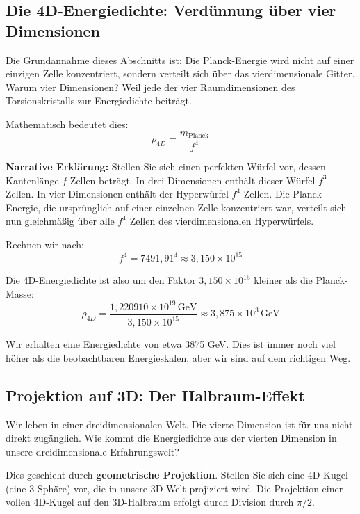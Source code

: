 	\subsection{Die 4D-Energiedichte: Verdünnung über vier Dimensionen}
	
	Die Grundannahme dieses Abschnitts ist: Die Planck-Energie wird nicht auf einer einzigen Zelle konzentriert, sondern verteilt sich über das vierdimensionale Gitter. Warum vier Dimensionen? Weil jede der vier Raumdimensionen des Torsionskristalls zur Energiedichte beiträgt.
	
	Mathematisch bedeutet dies:
	\begin{equation}
		\boxed{\rho_{4D} = \frac{m_{\text{Planck}}}{f^4}}
	\end{equation}
	
	\textbf{Narrative Erklärung:} Stellen Sie sich einen perfekten Würfel vor, dessen Kantenlänge \(f\) Zellen beträgt. In drei Dimensionen enthält dieser Würfel \(f^3\) Zellen. In vier Dimensionen enthält der Hyperwürfel \(f^4\) Zellen. Die Planck-Energie, die ursprünglich auf einer einzelnen Zelle konzentriert war, verteilt sich nun gleichmäßig über alle \(f^4\) Zellen des vierdimensionalen Hyperwürfels.
	
	Rechnen wir nach:
	\begin{equation}
		f^4 = 7491{,}91^4 \approx 3{,}150 \times 10^{15}
	\end{equation}
	
	Die 4D-Energiedichte ist also um den Faktor \(3{,}150 \times 10^{15}\) kleiner als die Planck-Masse:
	\begin{equation}
		\rho_{4D} = \frac{1{,}220910 \times 10^{19}\,\text{GeV}}{3{,}150 \times 10^{15}} \approx 3{,}875 \times 10^{3}\,\text{GeV}
	\end{equation}
	
	Wir erhalten eine Energiedichte von etwa 3875 GeV. Dies ist immer noch viel höher als die beobachtbaren Energieskalen, aber wir sind auf dem richtigen Weg.
	
	\subsection{Projektion auf 3D: Der Halbraum-Effekt}
	
	Wir leben in einer dreidimensionalen Welt. Die vierte Dimension ist für uns nicht direkt zugänglich. Wie kommt die Energiedichte aus der vierten Dimension in unsere dreidimensionale Erfahrungswelt?
	
	Dies geschieht durch \textbf{geometrische Projektion}. Stellen Sie sich eine 4D-Kugel (eine 3-Sphäre) vor, die in unsere 3D-Welt projiziert wird. Die Projektion einer vollen 4D-Kugel auf den 3D-Halbraum erfolgt durch Division durch \(\pi/2\).
	
